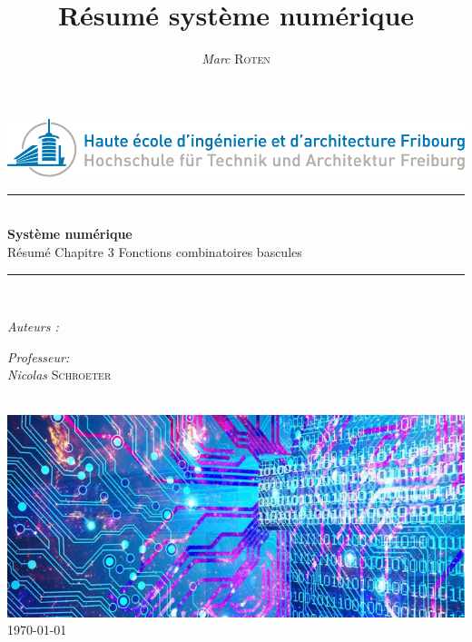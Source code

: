 
\title{Résumé système numérique} 
\author{\textsl{Marc} \textsc{Roten}}
\date{}


    \begin{titlepage}
        \begin{center}
            \includegraphics[scale=.4]{Img/heia-fr-logo.png}\\[1.3cm]
            
            \rule{\linewidth}{0.3mm} \\[0.3cm]
            {\huge \bfseries Système numérique\\[0.5cm]} 
            {\Large  Résumé Chapitre 3 Fonctions combinatoires bascules }
            \rule{\linewidth}{0.3mm} \\[0.8cm]
            \noindent{}
            \begin{minipage}[t]{0.4\textwidth}
                \begin{flushleft} \large
                    \emph{Auteurs :}\\
                    \theauthor
                \end{flushleft}
            \end{minipage}
            \begin{minipage}[t]{0.4\textwidth} 
                \begin{flushright} \large
                    \emph{Professeur:}\\
                    \textsl{Nicolas} \textsc{ Schroeter}\\ 
                \end{flushright} 
                \vfill
            \end{minipage}\\[1.3cm]
            \includegraphics[scale=0.7]{Img/title.jpg}\\[1.5cm]
            \vspace*{1\baselineskip}
            \today \\[0.7cm]
        \end{center}
    \end{titlepage}
    \tableofcontents
    \clearpage

